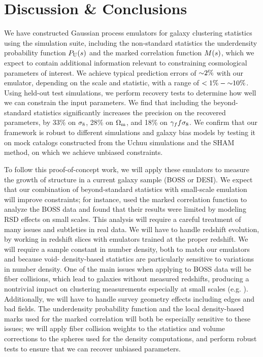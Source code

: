 \section{Discussion \& Conclusions}
\label{sec:discussion_aemulus}

We have constructed Gaussian process emulators for galaxy clustering statistics using the \aemulus simulation suite, including the non-standard statistics the underdensity probability function $P_\mathrm{U}(s)$ and the marked correlation function $M(s)$, which we expect to contain additional information relevant to constraining cosmological parameters of interest.
We achieve typical prediction errors of $\mathord{\sim}2\%$ with our emulator, depending on the scale and statistic, with a range of $<1\%-\mathord{\sim}10\%$.
Using held-out test simulations, we perform recovery tests to determine how well we can constrain the input parameters.
We find that including the beyond-standard statistics significantly increases the precision on the recovered parameters, by 33\% on 
$\sigma_\mathrm{8}$, 28\% on $\Omega_\mathrm{m}$, and 18\% on $\gamma_f f\sigma_8$.
We confirm that our framework is robust to different simulations and galaxy bias models by testing it on mock catalogs constructed from the Uchuu simulations and the SHAM method, on which we achieve unbiased constraints. 

To follow this proof-of-concept work, we will apply these emulators to measure the growth of structure in a current galaxy sample (BOSS or DESI). 
We expect that our combination of beyond-standard statistics with small-scale emulation will improve constraints; for instance, \cite{Satpathy2019a} used the marked correlation function to analyze the BOSS data and found that their results were limited by modeling RSD effects on small scales.
This analysis will require a careful treatment of many issues and subtleties in real data. 
We will have to handle redshift evolution, by working in redshift slices with emulators trained at the proper redshift.
We will require a sample constant in number density, both to match our emulators and because void- density-based statistics are particularly sensitive to variations in number density.
One of the main issues when applying to BOSS data will be fiber collisions, which lead to galaxies without measured redshifts, producing a nontrivial impact on clustering measurements especially at small scales (e.g. \citealt{Zehavi2002}).
Additionally, we will have to handle survey geometry effects including edges and bad fields.
The underdensity probability function and the local density-based marks used for the marked correlation will both be especially sensitive to these issues; we will apply fiber collision weights to the statistics and volume corrections to the spheres used for the density computations, and perform robust tests to ensure that we can recover unbiased parameters.

